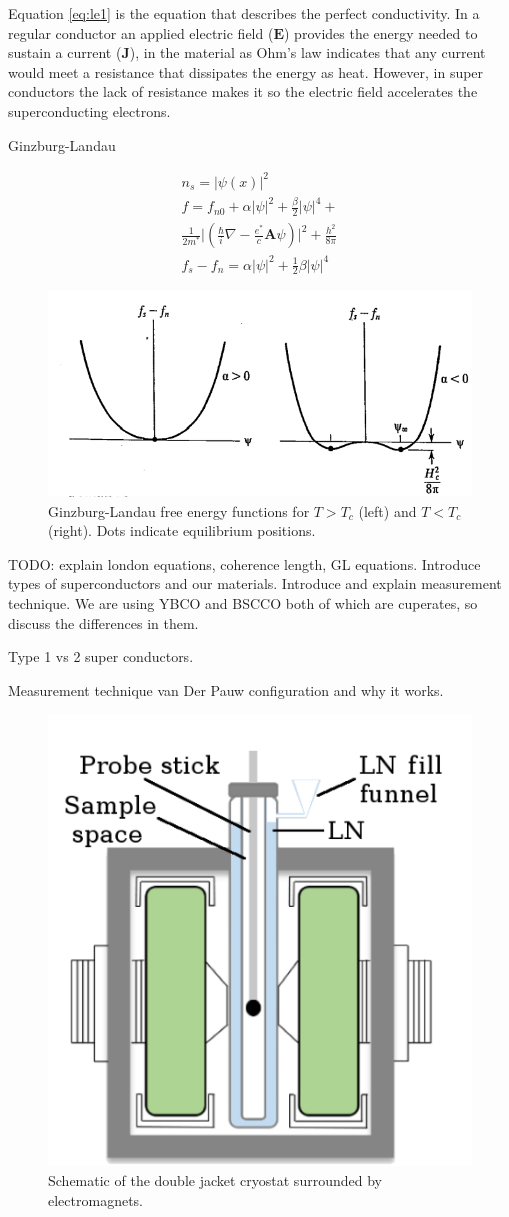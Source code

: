 \documentclass[
reprint,
amsmath,amssymb,
aps,
tikz,
border=5pt
]{revtex4-1}
\begin{document}
    Equation \ref{eq:le1} is the equation that describes the perfect conductivity. In a regular conductor an applied electric field ($\mathbf{E}$) provides the energy needed to sustain a current ($\mathbf{J}$), in the material as Ohm's law indicates that any current would meet a resistance that dissipates the energy as heat. However, in super conductors the lack of resistance makes it so the electric field accelerates the superconducting electrons. 
 

    Ginzburg-Landau

    \begin{gather}
      n_s = |\psi(x)|^2 \\
      f = f_{n0} + \alpha |\psi|^2 + \frac{\beta}{2}|\psi|^4 + \nonumber \\ \frac{1}{2m^*} \lvert\left(\frac{\hbar}{i}\nabla - \frac{e^*}{c}\mathbf{A}\psi\right)\rvert^2 + \frac{h^2}{8\pi} \\
      f_s - f_n = \alpha |\psi|^2 + \frac{1}{2}\beta|\psi|^4
    \end{gather}


    
    \begin{figure}[t]
      \includegraphics[width=0.5 \textwidth]{figures/gl_free_E.png}
      \caption{Ginzburg-Landau free energy functions for $T>T_c$ (left) and $T<T_c$ (right). Dots indicate equilibrium positions.~\cite{tinkham}}
      \label{fig:sc_pc}
    \end{figure}


    TODO: 
    explain london equations, coherence length, GL equations. Introduce types of superconductors and our materials. Introduce and explain measurement technique.
    We are using YBCO and BSCCO both of which are cuperates, so discuss the differences in them.\cite{Cohen92} 
    
    Type 1 vs 2 super conductors. 
    
    Measurement technique van Der Pauw configuration and why it works. \cite{tinkham}


    \begin{figure}[h]
      \includegraphics[width=0.35 \textwidth]{figures/cryostat.png}
      \caption{Schematic of the double jacket cryostat surrounded by electromagnets.}
      \label{fig:cryostat}
    \end{figure}
\end{document}
